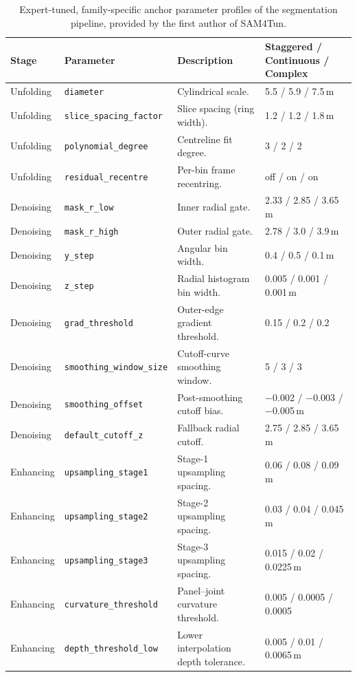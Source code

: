 \documentclass[a4paper,fleqn]{cas-dc}
\begin{document}
\begin{table}[t]
\caption{Expert-tuned, family-specific anchor parameter profiles of the segmentation pipeline, provided by the first author of SAM4Tun.}\label{tab:anchor-params}
\begin{tabular*}{\textwidth}{@{\extracolsep{\fill}} l l p{} l @{}}
\toprule
Stage & Parameter & Description & Staggered / Continuous / Complex \\
\midrule
Unfolding & \texttt{diameter} & Cylindrical scale. & 5.5 / 5.9 / 7.5\,m \\
Unfolding & \texttt{slice\_spacing\_factor} & Slice spacing (ring width). & 1.2 / 1.2 / 1.8\,m \\
Unfolding & \texttt{polynomial\_degree} & Centreline fit degree. & 3 / 2 / 2 \\
Unfolding & \texttt{residual\_recentre} & Per-bin frame recentring. & off / on / on \\
\midrule
Denoising & \texttt{mask\_r\_low} & Inner radial gate. & 2.33 / 2.85 / 3.65\,m \\
Denoising & \texttt{mask\_r\_high} & Outer radial gate. & 2.78 / 3.0 / 3.9\,m \\
Denoising & \texttt{y\_step} & Angular bin width. & 0.4 / 0.5 / 0.1\,m \\
Denoising & \texttt{z\_step} & Radial histogram bin width. & 0.005 / 0.001 / 0.001\,m \\
Denoising & \texttt{grad\_threshold} & Outer-edge gradient threshold. & 0.15 / 0.2 / 0.2 \\
Denoising & \texttt{smoothing\_window\_size} & Cutoff-curve smoothing window. & 5 / 3 / 3 \\
Denoising & \texttt{smoothing\_offset} & Post-smoothing cutoff bias. & $-$0.002 / $-$0.003 / $-$0.005\,m \\
Denoising & \texttt{default\_cutoff\_z} & Fallback radial cutoff. & 2.75 / 2.85 / 3.65\,m \\
\midrule
Enhancing & \texttt{upsampling\_stage1} & Stage-1 upsampling spacing. & 0.06 / 0.08 / 0.09\,m \\
Enhancing & \texttt{upsampling\_stage2} & Stage-2 upsampling spacing. & 0.03 / 0.04 / 0.045\,m \\
Enhancing & \texttt{upsampling\_stage3} & Stage-3 upsampling spacing. & 0.015 / 0.02 / 0.0225\,m \\
Enhancing & \texttt{curvature\_threshold} & Panel--joint curvature threshold. & 0.005 / 0.0005 / 0.0005 \\
Enhancing & \texttt{depth\_threshold\_low} & Lower interpolation depth tolerance. & 0.005 / 0.01 / 0.0065\,m \\

\end{tabular*}
\end{table}
\end{document}
